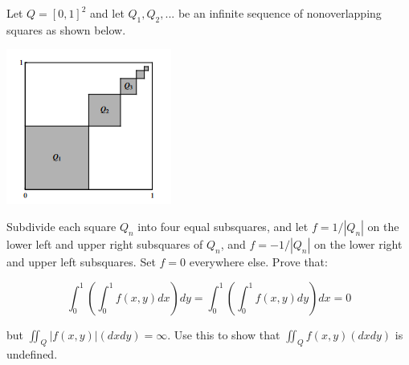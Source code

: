 \documentclass[10pt]{article}
\newenvironment{problem}[2][Problem]{\begin{trivlist}
\item[\hskip \labelsep {\bfseries #1}\hskip \labelsep {\bfseries #2.}]}{\end{trivlist}}
\begin{document}
\begin{problem}{4.6.12}

Let $Q = [0,1]^2$ and let $Q_1, Q_2,...$ be an infinite sequence of nonoverlapping squares as shown below.

\includegraphics[width=\linewidth]{squares}

Subdivide each square $Q_n$ into four equal subsquares, and let $f = 1/|Q_n|$ on the lower left and upper right subsquares of $Q_n$, and $f = -1/|Q_n|$ on the lower right and upper left subsquares. Set $f = 0$ everywhere else. Prove that:

$$ \int_0^1 (\int_0^1 f(x,y)dx)dy =  \int_0^1 (\int_0^1 f(x,y)dy)dx = 0$$

but $\iint_Q |f(x,y)| (dxdy) = \infty$. Use this to show that $\iint_Q f(x,y) (dxdy)$ is undefined.

\end{problem}
\end{document}
